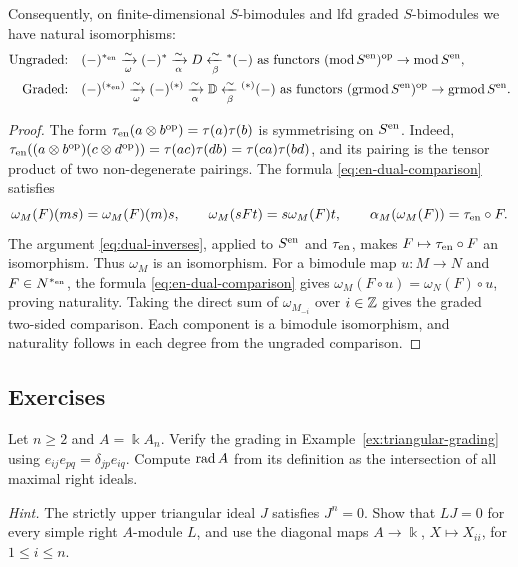 \begin{advanced}[suppressfirstparskip=true,innertopmargin=0pt]
\begin{theorem}
Consequently, on finite-dimensional $S$-bimodules and lfd graded $S$-bimodules we have natural isomorphisms:
\begin{align*}
\text{Ungraded:}\quad &(-)^{*_{\en}}\xrightarrow[\omega]{\sim}(-)^*
\xrightarrow[\alpha]{\sim}D\xleftarrow[\beta]{\sim}{}^*(-) \text{ as functors } (\mod S^\en)^\op\to\mod S^\en, \\
\text{Graded:}\quad  &(-)^{\grstar[_{\en}]}\xrightarrow[\omega]{\sim}(-)^{\grstar}
\xrightarrow[\alpha]{\sim}\bbD\xleftarrow[\beta]{\sim}{}^{\grstar}(-) \text{ as functors } (\grmod S^\en)^\op\to\grmod S^\en.
\end{align*}
\end{theorem}
\begin{proof}
The form $\tau_{\en}(a\otimes b^\op)=\tau(a)\tau(b)$ is symmetrising on $S^{\en}$.
Indeed, $\tau_{\en}((a\otimes b^\op)(c\otimes d^\op))=\tau(ac)\tau(db)=\tau(ca)\tau(bd)$, and its pairing is the tensor product of two non-degenerate pairings.
The formula \eqref{eq:en-dual-comparison} satisfies
\[
\omega_M(F)(ms)=\omega_M(F)(m)s,\qquad
\omega_M(sFt)=s\omega_M(F)t,\qquad
\alpha_M(\omega_M(F))=\tau_{\en}\circ F.
\]
The argument \eqref{eq:dual-inverses}, applied to $S^{\en}$ and $\tau_{\en}$, makes $F\mapsto\tau_{\en}\circ F$ an isomorphism.
Thus $\omega_M$ is an isomorphism.
For a bimodule map $u:M\to N$ and $F\in N^{*_{\en}}$, the formula \eqref{eq:en-dual-comparison} gives $\omega_M(F\circ u)=\omega_N(F)\circ u$, proving naturality.
Taking the direct sum of $\omega_{M_{-i}}$ over $i\in\Z$ gives the graded two-sided comparison.
Each component is a bimodule isomorphism, and naturality follows in each degree from the ungraded comparison.
\end{proof}
\end{advanced}


\subsection{Exercises}

\begin{exercise}
Let $n\geq2$ and $A=\Bbbk A_n$.
Verify the grading in Example~\ref{ex:triangular-grading} using $e_{ij}e_{pq}=\delta_{jp}e_{iq}$.
Compute $\rad A$ from its definition as the intersection of all maximal right ideals.

\emph{Hint.} The strictly upper triangular ideal $J$ satisfies $J^n=0$.
Show that $LJ=0$ for every simple right $A$-module $L$, and use the diagonal maps $A\to\Bbbk$, $X\mapsto X_{ii}$, for $1\leq i\leq n$.
\end{exercise}

